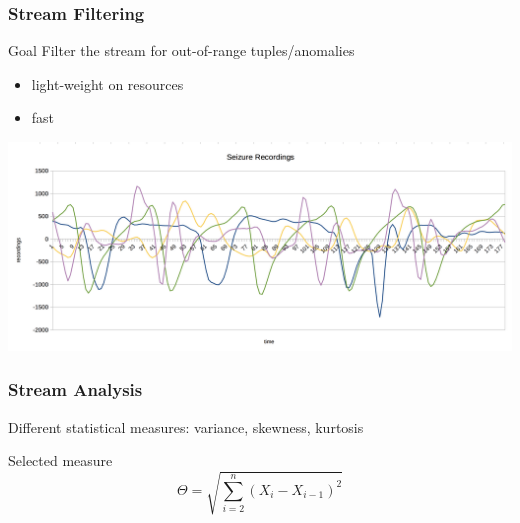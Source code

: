 \documentclass[xelatex,usenames,dvipsnames]{beamer}
\begin{document}
  \begin{frame}
    \frametitle{Stream Filtering}
    
    \alert{Goal} Filter the stream for out-of-range tuples/anomalies
    \begin{itemize}
      \item light-weight on resources
      \item fast
    \end{itemize}
    
    \includegraphics[width = \textwidth]{figs/Seizures.png}
    
  \end{frame}
  
  \begin{frame}
    \frametitle{Stream Analysis}
    
    Different statistical measures: variance, skewness, kurtosis \cite{Carney2011}

      
      
    \begin{exampleblock}{Selected measure}
      \begin{equation*}
        \Theta = \sqrt{\sum_{i=2}^{n}{(X_i - X_{i-1})^2}}
      \end{equation*}
    \end{exampleblock}

      
    
  \end{frame}

\end{document}
